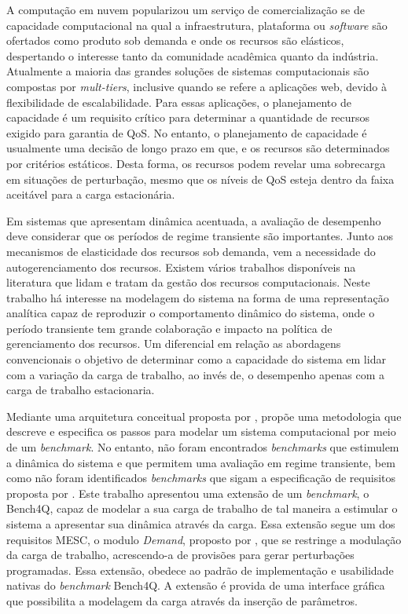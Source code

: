 A computação em nuvem popularizou um serviço de comercialização se de capacidade computacional na qual a infraestrutura, plataforma ou \textit{software} são ofertados como produto sob demanda e onde os recursos são elásticos, despertando o interesse tanto da comunidade acadêmica quanto da indústria. Atualmente a maioria das grandes soluções de sistemas computacionais são compostas por \textit{mult-tiers}, inclusive quando se refere a aplicações web, devido à flexibilidade de escalabilidade. Para essas aplicações, o planejamento de capacidade é um requisito crítico para determinar a quantidade de recursos exigido para garantia de QoS. No entanto, o planejamento de capacidade é usualmente uma decisão de longo prazo em que, e os recursos são determinados por critérios estáticos. Desta forma, os recursos podem revelar uma sobrecarga em situações de perturbação, mesmo que os níveis de QoS esteja dentro da faixa aceitável para a carga estacionária. %

Em sistemas que apresentam dinâmica acentuada, a avaliação de desempenho deve considerar que os períodos de regime transiente são importantes. Junto aos mecanismos de elasticidade dos recursos sob demanda, vem a necessidade do autogerenciamento dos recursos. Existem vários trabalhos disponíveis na literatura que lidam e tratam da gestão dos recursos computacionais. Neste trabalho há interesse na modelagem do sistema na forma de uma representação analítica capaz de reproduzir o comportamento dinâmico do sistema, onde o período transiente tem grande colaboração e impacto na política de gerenciamento dos recursos. Um diferencial em relação as abordagens convencionais o objetivo de determinar como a capacidade do sistema em lidar com a variação da carga de trabalho, ao invés de, o desempenho apenas com a carga de trabalho estacionaria.

Mediante uma arquitetura conceitual proposta por ,  propõe uma metodologia que descreve e especifica os passos para modelar um sistema computacional por meio de um \textit{benchmark}. No entanto, não foram encontrados \textit{benchmarks} que estimulem a dinâmica do sistema e que permitem uma avaliação em regime transiente, bem como não foram identificados \textit{benchmarks} que sigam a especificação de requisitos proposta por .
Este trabalho apresentou uma extensão de um \textit{benchmark}, o Bench4Q, capaz de modelar a sua carga de trabalho de tal maneira a estimular o sistema a apresentar sua dinâmica através da carga. Essa extensão segue um dos requisitos MESC, o modulo \textit{Demand}, proposto por , que se restringe a modulação da carga de trabalho, acrescendo-a de provisões para gerar perturbações programadas. Essa extensão, obedece ao padrão de implementação e usabilidade nativas do \textit{benchmark} Bench4Q. A extensão é provida de uma interface gráfica que possibilita a modelagem da carga através da inserção de parâmetros.

